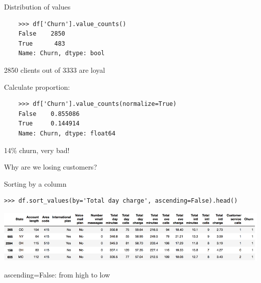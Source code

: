 \documentclass[aspectratio=169,usenames,dvipsnames]{beamer}
\begin{document}
\begin{frame}[fragile]{Distribution of values}
    \begin{lstlisting}
    >>> df['Churn'].value_counts()
    False    2850
    True      483
    Name: Churn, dtype: bool
    \end{lstlisting}

    2850 clients out of 3333 are loyal

    \vspace{1em}\pause
    Calculate proportion:
    \begin{lstlisting}
    >>> df['Churn'].value_counts(normalize=True)
    False    0.855086
    True     0.144914
    Name: Churn, dtype: float64
    \end{lstlisting}

    14\% churn, very bad!

    \vspace{1em}
    Why are we losing customers?

\end{frame}

\begin{frame}[fragile]{Sorting by a column}
\begin{lstlisting}
>>> df.sort_values(by='Total day charge', ascending=False).head()
\end{lstlisting}

    \includegraphics[height=0.3\textheight]{fig/telecomsort}

    ascending=False: from high to low
\end{frame}
\end{document}

